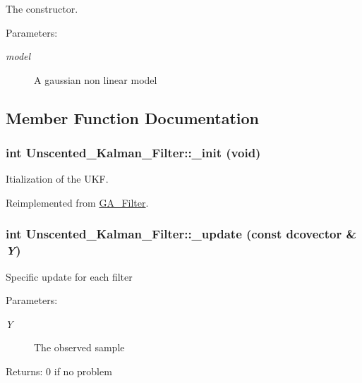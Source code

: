 The constructor. 

\begin{Desc}
\item[Parameters:]
\begin{description}
\item[{\em model}]A gaussian non linear model \end{description}
\end{Desc}


\subsection{Member Function Documentation}
\hypertarget{class_unscented___kalman___filter_a6ca6d9f8b5a4a40c18b6cdfdc2029fa}{
\subsubsection[{\_\-init}]{\setlength{\rightskip}{0pt plus 5cm}int Unscented\_\-Kalman\_\-Filter::\_\-init (void)}}
\label{class_unscented___kalman___filter_a6ca6d9f8b5a4a40c18b6cdfdc2029fa}


Itialization of the UKF. 



Reimplemented from \hyperlink{class_g_a___filter_7b5cb872bcedd752a4309f114625a4b8}{GA\_\-Filter}.\hypertarget{class_unscented___kalman___filter_ee1e0a8035111d7695b6958c644f97cc}{
\subsubsection[{\_\-update}]{\setlength{\rightskip}{0pt plus 5cm}int Unscented\_\-Kalman\_\-Filter::\_\-update (const dcovector \& {\em Y})}}
\label{class_unscented___kalman___filter_ee1e0a8035111d7695b6958c644f97cc}


Specific update for each filter

\begin{Desc}
\item[Parameters:]
\begin{description}
\item[{\em Y}]The observed sample\end{description}
\end{Desc}
\begin{Desc}
\item[Returns:]0 if no problem \end{Desc}


